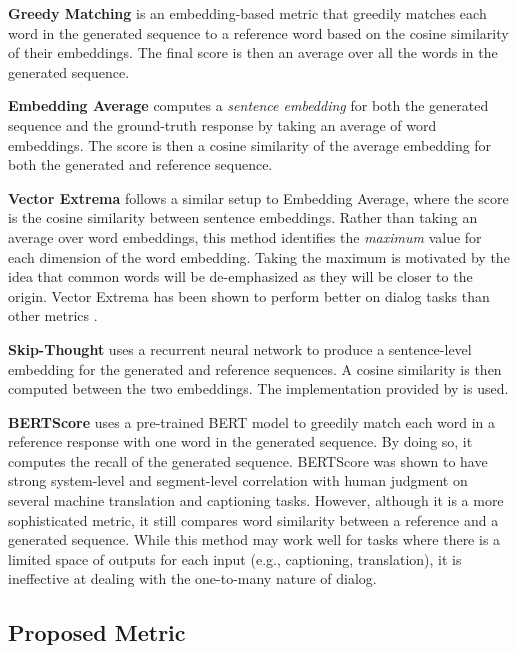 \documentclass[11pt,a4paper]{article}
\begin{document}
\textbf{Greedy Matching} \citep{rus2012comparison} is an embedding-based metric that greedily matches each word in the generated sequence to a reference word based on the cosine similarity of their embeddings. The final score is then an average over all the words in the generated sequence. 

\textbf{Embedding Average} \citep{wieting2015towards} computes a \textit{sentence embedding} for both the generated sequence and the ground-truth response by taking an average of word embeddings. The score is then a cosine similarity of the average embedding for both the generated and reference sequence.

\textbf{Vector Extrema} \citep{forgues2014bootstrapping} follows a similar setup to Embedding Average, where the score is the cosine similarity between sentence embeddings. Rather than taking an average over word embeddings, this method identifies the \textit{maximum} value for each dimension of the word embedding. Taking the maximum is motivated by the idea that common words will be de-emphasized as they will be closer to the origin. Vector Extrema has been shown to perform better on dialog tasks than other metrics \citep{gupta2019investigating,liu2016not}. 

\textbf{Skip-Thought} \citep{kiros2015skip} uses a recurrent neural network to produce a sentence-level embedding for the generated and reference sequences. A cosine similarity is then computed between the two embeddings. The implementation provided by \citet{sharma2017relevance} is used.

\textbf{BERTScore} \citep{zhang2019bertscore} uses a pre-trained BERT \citep{devlin2018bert} model to greedily match each word in a reference response with one word in the generated sequence. By doing so, it computes the recall of the generated sequence. BERTScore was shown to have strong system-level and segment-level correlation with human judgment on several machine translation and captioning tasks. However, although it is a more sophisticated metric, it still compares word similarity between a reference and a generated sequence. While this method may work well for tasks where there is a limited space of outputs for each input (e.g., captioning, translation), it is ineffective at dealing with the one-to-many nature of dialog.

\subsection{Proposed Metric}
\label{new}
\end{document}
